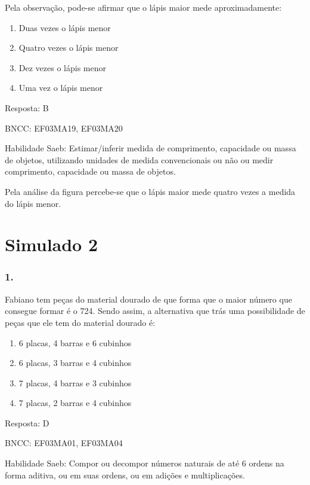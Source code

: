 Pela observação, pode-se afirmar que o lápis maior mede aproximadamente:

\begin{enumerate}
\def\labelenumi{\alph{enumi})}
\item
  Duas vezes o lápis menor
\item
  Quatro vezes o lápis menor
\item
  Dez vezes o lápis menor
\item
  Uma vez o lápis menor
\end{enumerate}

Resposta: B

BNCC: EF03MA19, EF03MA20

Habilidade Saeb: Estimar/inferir medida de comprimento, capacidade ou
massa de objetos, utilizando unidades de medida convencionais ou não ou
medir comprimento, capacidade ou massa de objetos.

Pela análise da figura percebe-se que o lápis maior mede quatro vezes a
medida do lápis menor.

\section{Simulado 2}\label{simulado-2}

\subsubsection{1.}\label{section-141}

Fabiano tem peças do material dourado de que forma que o maior número
que consegue formar é o 724. Sendo assim, a alternativa que trás uma
possibilidade de peças que ele tem do material dourado é:

\begin{enumerate}
\def\labelenumi{\alph{enumi})}
\item
  6 placas, 4 barras e 6 cubinhos
\item
  6 placas, 3 barras e 4 cubinhos
\item
  7 placas, 4 barras e 3 cubinhos
\item
  7 placas, 2 barras e 4 cubinhos
\end{enumerate}

Resposta: D

BNCC: EF03MA01, EF03MA04

Habilidade Saeb: Compor ou decompor números naturais de até 6 ordens na
forma aditiva, ou em suas ordens, ou em adições e multiplicações.

